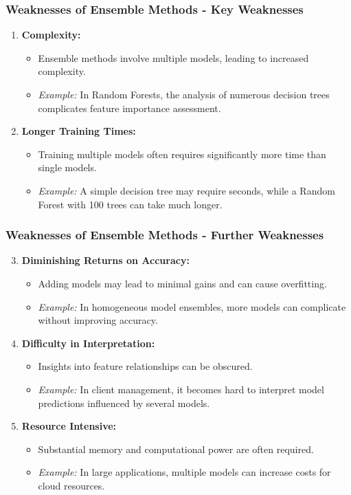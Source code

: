 \documentclass[aspectratio=169]{beamer}
\begin{document}
\begin{frame}[fragile]
    \frametitle{Weaknesses of Ensemble Methods - Key Weaknesses}
    \begin{enumerate}
        \item \textbf{Complexity:}
        \begin{itemize}
            \item Ensemble methods involve multiple models, leading to increased complexity.
            \item \textit{Example:} In Random Forests, the analysis of numerous decision trees complicates feature importance assessment.
        \end{itemize}
        
        \item \textbf{Longer Training Times:}
        \begin{itemize}
            \item Training multiple models often requires significantly more time than single models.
            \item \textit{Example:} A simple decision tree may require seconds, while a Random Forest with 100 trees can take much longer.
        \end{itemize}
    \end{enumerate}
\end{frame}

\begin{frame}[fragile]
    \frametitle{Weaknesses of Ensemble Methods - Further Weaknesses}
    \begin{enumerate}
        \setcounter{enumi}{2}
        \item \textbf{Diminishing Returns on Accuracy:}
        \begin{itemize}
            \item Adding models may lead to minimal gains and can cause overfitting.
            \item \textit{Example:} In homogeneous model ensembles, more models can complicate without improving accuracy.
        \end{itemize}

        \item \textbf{Difficulty in Interpretation:}
        \begin{itemize}
            \item Insights into feature relationships can be obscured.
            \item \textit{Example:} In client management, it becomes hard to interpret model predictions influenced by several models.
        \end{itemize}

        \item \textbf{Resource Intensive:}
        \begin{itemize}
            \item Substantial memory and computational power are often required.
            \item \textit{Example:} In large applications, multiple models can increase costs for cloud resources.
        \end{itemize}
    \end{enumerate}
\end{frame}
\end{document}
